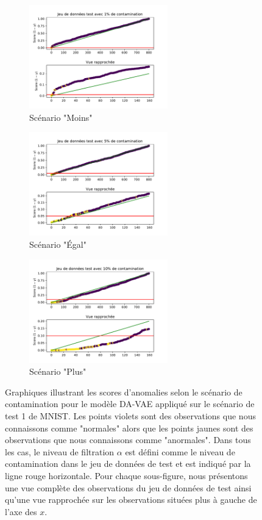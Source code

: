 \begin{figure}[H]
	\centering
	\begin{subfigure}{6cm}
		\centering\includegraphics[width=6cm]{images/images_davae/pvalues_scenario3_moins}
		\caption{Scénario "Moins"}
	\end{subfigure}
	\begin{subfigure}{6cm}
		\centering\includegraphics[width=6cm]{images/images_davae/pvalues_scenario3_egal}
		\caption{Scénario "Égal"}
	\end{subfigure}
	\begin{subfigure}{6cm}
		\centering\includegraphics[width=6cm]{images/images_davae/pvalues_scenario3_plus}
		\caption{Scénario "Plus"}
	\end{subfigure}
	\DIFdelbeginFL %
\DIFdelendFL \DIFaddbeginFL \caption[Graphiques illustrant les scores d'anomalies selon le scénario de contamination pour le modèle DA-VAE appliqué sur le scénario de test 1 de \textit{MNIST}.]{\DIFaddendFL Graphiques illustrant les scores d'anomalies selon le scénario de contamination pour le modèle DA-VAE appliqué sur le scénario de test 1 de MNIST. Les points violets sont des observations que nous connaissons comme "normales" alors que les points jaunes sont des observations que nous connaissons comme "anormales". Dans tous les cas, le niveau de filtration $\alpha$ est défini comme le niveau de contamination dans le jeu de données de test et est indiqué par la ligne rouge horizontale. Pour chaque sous-figure, nous présentons une vue complète des observations du jeu de données de test ainsi qu'une vue rapprochée sur les observations situées plus à gauche de l'axe des $x$.}
	\label{fig:pvalues_scenarios_mnist}
\end{figure}

